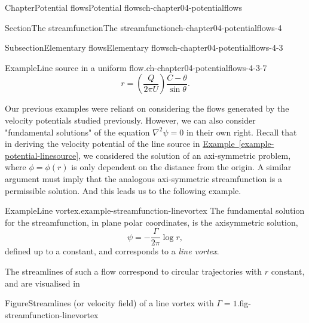 \documentclass[oneside,10pt,]{book}
\newcommand{\xreffont}{\relax}
\numberwithin{equation}{section}
\begin{document}
\begin{chapterptx}{Chapter}{Potential flows}{}{Potential flows}{}{}{ch-chapter04-potentialflows}
\begin{sectionptx}{Section}{The streamfunction}{}{The streamfunction}{}{}{ch-chapter04-potentialflows-4}
\begin{subsectionptx}{Subsection}{Elementary flows}{}{Elementary flows}{}{}{ch-chapter04-potentialflows-4-3}
\begin{example}{Example}{Line source in a uniform flow.}{ch-chapter04-potentialflows-4-3-7}
\begin{equation*}
r = \left(\frac{Q}{2\pi U}\right) \frac{C - \theta}{\sin\theta}.
\end{equation*}
%
\end{example}
Our previous examples were reliant on considering the flows generated by the velocity potentials studied previously. However, we can also consider "fundamental solutions" of the equation \(\nabla^2 \psi = 0\) in their own right. Recall that in deriving the velocity potential of the line source in \hyperref[example-potential-linesource]{Example~{\xreffont\ref{example-potential-linesource}}}, we considered the solution of an axi-symmetric problem, where \(\phi = \phi(r)\) is only dependent on the distance from the origin. A similar argument must imply that the analogous axi-symmetric streamfunction is a permissible solution. And this leads us to the following example.%
\begin{example}{Example}{Line vortex.}{example-streamfunction-linevortex}%
%
The fundamental solution for the streamfunction, in plane polar coordinates, is the axisymmetric solution,%
\begin{equation}
\psi = -\frac{\Gamma}{2\pi}\log r,\label{eqn-streamfunction-linevortex}
\end{equation}
defined up to a constant, and corresponds to a \emph{line vortex}.%
\par
The streamlines of such a flow correspond to circular trajectories with \(r\) constant, and are visualised in %
\begin{figureptx}{Figure}{Streamlines (or velocity field) of a line vortex with \(\Gamma = 1\).}{fig-streamfunction-linevortex}{}%
\begin{image}{0.05}{0.9}{0.05}{}%

\end{image}
\end{figureptx}
\end{example}
\end{subsectionptx}
\end{sectionptx}
\end{chapterptx}
\end{document}
